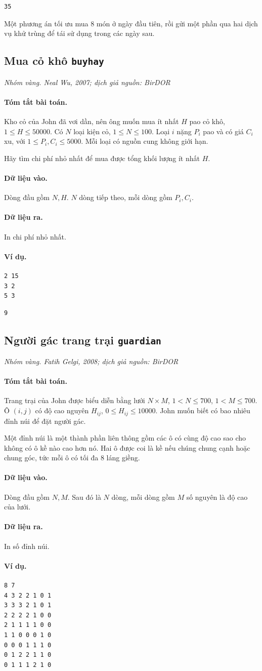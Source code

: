 \documentclass[11pt]{article}
\newcommand{\problem}[4]{%
  \subsection[#1 (#2)]{#1 \hfill {\normalsize\texttt{#2}}}%
  \noindent\textit{#3. #4}\par\smallskip
}
\newcommand{\iosec}[1]{\paragraph{#1}}
\begin{document}
\begin{verbatim}
35
\end{verbatim}

Một phương án tối ưu mua \(8\) món ở ngày đầu tiên, rồi gửi một phần qua hai
dịch vụ khử trùng để tái sử dụng trong các ngày sau.

\problem{Mua cỏ khô}{buyhay}{Nhóm vàng}{Neal Wu, 2007; dịch giả nguồn: BirDOR}

\iosec{Tóm tắt bài toán.}
Kho cỏ của John đã vơi dần, nên ông muốn mua ít nhất \(H\) pao cỏ khô,
\(1\le H\le 50000\). Có \(N\) loại kiện cỏ, \(1\le N\le 100\). Loại \(i\)
nặng \(P_i\) pao và có giá \(C_i\) xu, với \(1\le P_i,C_i\le 5000\). Mỗi
loại có nguồn cung không giới hạn.

Hãy tìm chi phí nhỏ nhất để mua được tổng khối lượng ít nhất \(H\).

\iosec{Dữ liệu vào.}
Dòng đầu gồm \(N,H\). \(N\) dòng tiếp theo, mỗi dòng gồm \(P_i,C_i\).

\iosec{Dữ liệu ra.}
In chi phí nhỏ nhất.

\iosec{Ví dụ.}
\begin{verbatim}
2 15
3 2
5 3
\end{verbatim}

\begin{verbatim}
9
\end{verbatim}

\problem{Người gác trang trại}{guardian}{Nhóm vàng}{Fatih Gelgi, 2008; dịch giả nguồn: BirDOR}

\iosec{Tóm tắt bài toán.}
Trang trại của John được biểu diễn bằng lưới \(N\times M\),
\(1<N\le 700\), \(1<M\le 700\). Ô \((i,j)\) có độ cao nguyên
\(H_{ij}\), \(0\le H_{ij}\le 10000\). John muốn biết có bao nhiêu đỉnh núi
để đặt người gác.

Một đỉnh núi là một thành phần liên thông gồm các ô có cùng độ cao sao cho
không có ô kề nào cao hơn nó. Hai ô được coi là kề nếu chúng chung cạnh hoặc
chung góc, tức mỗi ô có tối đa \(8\) láng giềng.

\iosec{Dữ liệu vào.}
Dòng đầu gồm \(N,M\). Sau đó là \(N\) dòng, mỗi dòng gồm \(M\) số nguyên là
độ cao của lưới.

\iosec{Dữ liệu ra.}
In số đỉnh núi.

\iosec{Ví dụ.}
\begin{verbatim}
8 7
4 3 2 2 1 0 1
3 3 3 2 1 0 1
2 2 2 2 1 0 0
2 1 1 1 1 0 0
1 1 0 0 0 1 0
0 0 0 1 1 1 0
0 1 2 2 1 1 0
0 1 1 1 2 1 0
\end{verbatim}
\end{document}
